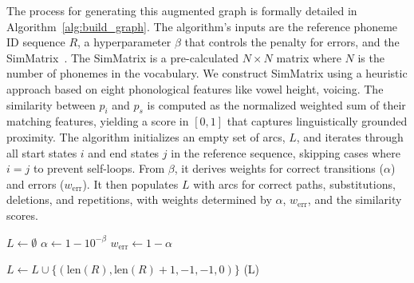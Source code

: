 The process for generating this augmented graph is formally detailed in Algorithm~\ref{alg:build_graph}. The algorithm's inputs are the reference phoneme ID sequence $R$, a hyperparameter $\beta$ that controls the penalty for errors, and the SimMatrix~\cite{zhou2025phonetic-error-detection}. The SimMatrix is a pre-calculated $N \times N$ matrix where $N$ is the number of phonemes in the vocabulary. We construct SimMatrix using a heuristic approach based on eight phonological features like vowel height, voicing. The similarity between $p_i$ and $p_s$ is computed as the normalized weighted sum of their matching features, yielding a score in $[0, 1]$ that captures linguistically grounded proximity. The algorithm initializes an empty set of arcs, $L$, and iterates through all start states $i$ and end states $j$ in the reference sequence, skipping cases where $i=j$ to prevent self-loops. From $\beta$, it derives weights for correct transitions ($\alpha$) and errors ($w_{\text{err}}$). It then populates $L$ with arcs for correct paths, substitutions, deletions, and repetitions, with weights determined by $\alpha$, $w_{\text{err}}$, and the similarity scores.

\vspace{0mm}
\begin{algorithm}[htbp]
\DontPrintSemicolon
\caption{Building the Augmented WFST Graph} %
\label{alg:build_graph}



$L \leftarrow \emptyset$ 
$\alpha \leftarrow 1 - 10^{-\beta}$\;
$w_{\text{err}} \leftarrow 1 - \alpha$\;

$L \leftarrow L \cup \{(\text{len}(R), \text{len}(R)+1, -1, -1, 0)\}$ 
\KwRet {}(L)\;
\end{algorithm}
\vspace{-2mm}

